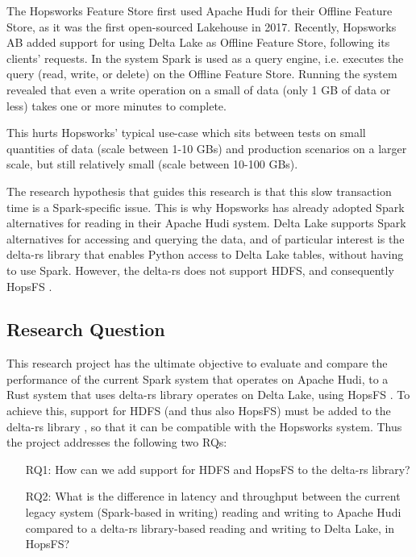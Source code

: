 The Hopsworks Feature Store \cite{HopsworksBatchRealtime2024} first used Apache Hudi for their Offline Feature Store, as it was the first open-sourced Lakehouse in 2017. Recently, Hopsworks \gls{AB} added support for using Delta Lake as Offline Feature Store, following its clients' requests. In the system Spark is used as a query engine, i.e. executes the query (read, write, or delete) on the Offline Feature Store. Running the system revealed that even a write operation on a small of data (only 1 GB of data or less) takes one or more minutes to complete.

This hurts Hopsworks' typical use-case which sits between tests on small quantities of data (scale between 1-10 GBs) and production scenarios on a larger scale, but still relatively small (scale between 10-100 GBs).

The research hypothesis that guides this research is that this slow transaction time is a Spark-specific issue. This is why Hopsworks has already adopted Spark alternatives \cite{Khazanchi1801362} for reading in their Apache Hudi system. Delta Lake supports Spark alternatives for accessing and querying the data, and of particular interest is the delta-rs library \cite{DeltaioDeltars2024} that enables Python access to Delta Lake tables, without having to use Spark. 
However, the delta-rs \cite{DeltaioDeltars2024} does not support \gls{HDFS}, and consequently \gls{HopsFS} \cite{niaziHopsFSScalingHierarchical2017}.

\subsection{Research Question}
\label{subsec:researchQuestion}
This research project has the ultimate objective to evaluate and compare the performance of the current Spark system that operates on Apache Hudi, to a Rust system that uses delta-rs library \cite{DeltaioDeltars2024} operates on Delta Lake, using \gls{HopsFS} \cite{niaziHopsFSScalingHierarchical2017}. To achieve this, support for \gls{HDFS} (and thus also \gls{HopsFS}) must be added to the delta-rs library \cite{DeltaioDeltars2024}, so that it can be compatible with the Hopsworks system. Thus the project addresses the following two \glspl{RQ}:
\begin{enumerate}
    \item[RQ1:] How can we add support for \gls{HDFS} and \gls{HopsFS} to the delta-rs library?
    \item[RQ2:] What is the difference in latency and throughput between the current legacy system (Spark-based in writing) reading and writing to Apache Hudi compared to a delta-rs library-based reading and writing to Delta Lake, in \gls{HopsFS}?
\end{enumerate}

